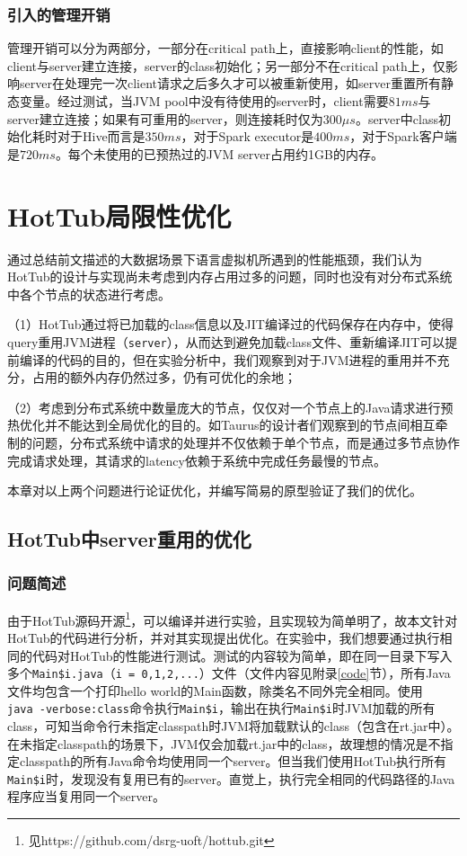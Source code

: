 \documentclass[lang=cn,12pt,a4paper,cite=authoryear]{elegantpaper}
\begin{document}
\begin{figure*}[!htp]
\subsubsection{引入的管理开销}
管理开销可以分为两部分，一部分在critical path上，直接影响client的性能，如client与server建立连接，server的class初始化；另一部分不在critical path上，仅影响server在处理完一次client请求之后多久才可以被重新使用，如server重置所有静态变量。经过测试，当JVM pool中没有待使用的server时，client需要$81ms$与server建立连接；如果有可重用的server，则连接耗时仅为$300\mu{}s$。server中class初始化耗时对于Hive而言是$350ms$，对于Spark executor是$400ms$，对于Spark客户端是$720ms$。每个未使用的已预热过的JVM server占用约1GB的内存。

\section{HotTub局限性优化}
通过总结前文描述的大数据场景下语言虚拟机所遇到的性能瓶颈，我们认为HotTub的设计与实现尚未考虑到内存占用过多的问题，同时也没有对分布式系统中各个节点的状态进行考虑。

（1）HotTub通过将已加载的class信息以及JIT编译过的代码保存在内存中，使得query重用JVM进程（\texttt{server}），从而达到避免加载class文件、重新编译JIT可以提前编译的代码的目的，但在实验分析中，我们观察到对于JVM进程的重用并不充分，占用的额外内存仍然过多，仍有可优化的余地；

（2）考虑到分布式系统中数量庞大的节点，仅仅对一个节点上的Java请求进行预热优化并不能达到全局优化的目的。如Taurus\cite{DBLP:conf/asplos/MaasA0K16}的设计者们观察到的节点间相互牵制的问题，分布式系统中请求的处理并不仅依赖于单个节点，而是通过多节点协作完成请求处理，其请求的latency依赖于系统中完成任务最慢的节点。

本章对以上两个问题进行论证优化，并编写简易的原型验证了我们的优化。

\subsection{HotTub中server重用的优化}
\subsubsection{问题简述}
由于HotTub源码开源\footnote{见https://github.com/dsrg-uoft/hottub.git}，可以编译并进行实验，且实现较为简单明了，故本文针对HotTub的代码进行分析，并对其实现提出优化。在实验中，我们想要通过执行相同的代码对HotTub的性能进行测试。测试的内容较为简单，即在同一目录下写入多个\texttt{Main\$i.java}（\texttt{i = 0,1,2,...}）文件（文件内容见附录\ref{code}节），所有Java文件均包含一个打印hello world的Main函数，除类名不同外完全相同。使用\texttt{java\ -verbose:class}命令执行\texttt{Main\$i}，输出在执行\texttt{Main\$i}时JVM加载的所有class，可知当命令行未指定classpath时JVM将加载默认的class（包含在rt.jar中）。在未指定classpath的场景下，JVM仅会加载rt.jar中的class，故理想的情况是不指定classpath的所有Java命令均使用同一个server。但当我们使用HotTub执行所有\texttt{Main\$i}时，发现没有复用已有的server。直觉上，执行完全相同的代码路径的Java程序应当复用同一个server。


\end{figure*}
\end{document}
